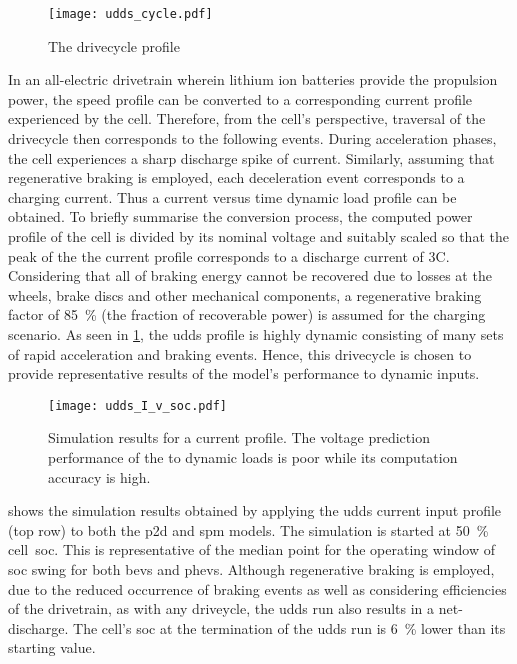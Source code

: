 \begin{figure}[!htbp]
    \centering
    \texttt{[image: udds\_cycle.pdf]}
    \caption{The  drivecycle profile}
    \label{fig:uddsspeedvstimecycle}
\end{figure}

In  an  all-electric  drivetrain  wherein  lithium  ion  batteries  provide  the
propulsion power, the speed profile can  be converted to a corresponding current
profile  experienced  by  the  cell. Therefore,  from  the  cell's  perspective,
traversal of  the drivecycle  then corresponds to  the following  events. During
acceleration phases,  the cell experiences  a sharp discharge spike  of current.
Similarly,  assuming that  regenerative braking  is employed,  each deceleration
event corresponds to a charging current. Thus a current versus time dynamic load
profile  can be  obtained.  To  briefly summarise  the  conversion process,  the
computed  power profile  of  the cell  is  divided by  its  nominal voltage  and
suitably scaled  so that the  peak of the the  current profile corresponds  to a
discharge  current of  3C.  Considering that  all of  braking  energy cannot  be
recovered  due  to losses  at  the  wheels,  brake  discs and  other  mechanical
components,  a regenerative  braking factor  of \SI{85}{\percent}  (the fraction
of  recoverable  power)  is  assumed  for the  charging  scenario.  As  seen  in
\cref{fig:uddsspeedvstimecycle},  the  \gls{udds}   profile  is  highly  dynamic
consisting  of  many sets  of  rapid  acceleration  and braking  events.  Hence,
this  drivecycle is  chosen to  provide  representative results  of the  model's
performance to dynamic inputs.


\begin{figure}[!htbp]
    \centering
    \texttt{[image: udds\_I\_v\_soc.pdf]} %
    \caption[Simulation results of  and 
    models to  current profile]{Simulation results for a
         current profile. The voltage prediction performance
        of the  to dynamic loads is poor while its
     computation accuracy is high.}
    \label{fig:uddssimp2dspmresults}
\end{figure}

  shows   the  simulation  results   obtained  by
applying  the   \gls{udds}  current  input   profile  (top  row)  to   both  the
\gls{p2d} and \gls{spm}  models. The simulation is  started at \SI{50}{\percent}
cell~\gls{soc}. This  is representative  of the median  point for  the operating
window  of  \gls{soc} swing  for  both  \glspl{bev} and  \glspl{phev}.  Although
regenerative  braking is  employed, due  to  the reduced  occurrence of  braking
events  as well  as  considering efficiencies  of the  drivetrain,  as with  any
driveycle,  the \gls{udds}  run  also  results in  a  net-discharge. The  cell's
\gls{soc} at  the termination of  the \gls{udds} run  is \approx\SI{6}{\percent}
lower than its starting value.

